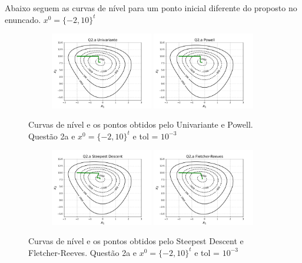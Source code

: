 \documentclass[10pt, a4paper]{article}
\begin{document}
Abaixo seguem as curvas de nível para um ponto inicial diferente do proposto no enuncado. $x^0 = \{-2,10\}^t$

\begin{figure}[H]
  \centering
  \begin{subfigure}[b]{\textwidth}
    \includegraphics[width=0.49\textwidth]{figuras/Q2.a_Univariante_P0=[-2 10].pdf}
    \includegraphics[width=0.49\textwidth]{figuras/Q2.a_Powell_P0=[-2 10].pdf}
  \end{subfigure}
  \caption{Curvas de nível e os pontos obtidos pelo Univariante e Powell. Questão 2a e $x^0 = \{-2,10\}^t$ e tol = $10^{-3}$}
\end{figure}

\begin{figure}[H]
  \centering
  \begin{subfigure}[b]{\textwidth}
    \includegraphics[width=0.49\textwidth]{figuras/Q2.a_Steepest Descent_P0=[-2 10].pdf}
    \includegraphics[width=0.49\textwidth]{figuras/Q2.a_Fletcher-Reeves_P0=[-2 10].pdf}
  \end{subfigure}
  \caption{Curvas de nível e os pontos obtidos pelo Steepest Descent e Fletcher-Reeves. Questão 2a e $x^0 = \{-2,10\}^t$ e tol = $10^{-3}$}
\end{figure}
\end{document}
